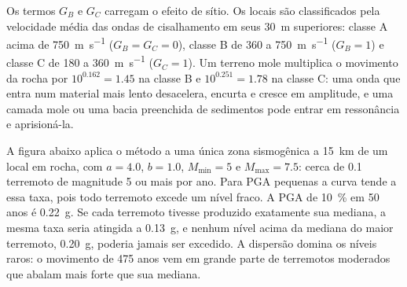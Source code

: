 Os termos $G_B$ e $G_C$ carregam o efeito de sítio. Os locais são classificados pela velocidade média das ondas
de cisalhamento em seus \qty{30}{m} superiores: classe A acima de \qty{750}{m.s^{-1}} ($G_B = G_C = 0$), classe B de
360 a \qty{750}{m.s^{-1}} ($G_B = 1$) e classe C de 180 a \qty{360}{m.s^{-1}} ($G_C = 1$). Um terreno
mole multiplica o movimento da rocha por $10^{0.162} = 1.45$ na classe B e $10^{0.251} = 1.78$ na classe
C: uma onda que entra num material mais lento desacelera, encurta e cresce em amplitude, e uma camada mole ou uma
bacia preenchida de sedimentos pode entrar em ressonância e aprisioná-la.

A figura abaixo aplica o método a uma única zona sismogênica a \qty{15}{km} de um local em rocha, com $a
= 4.0$, $b = 1.0$, $M_{\min} = 5$ e $M_{\max} = 7.5$: cerca de 0.1 terremoto de magnitude 5 ou
mais por ano. Para PGA pequenas a curva tende a essa taxa, pois todo terremoto excede um nível
fraco. A PGA de \qty{10}{\percent} em 50 anos é \qty{0.22}{g}. Se cada terremoto tivesse produzido
exatamente sua mediana, a mesma taxa seria atingida a \qty{0.13}{g}, e nenhum nível acima da mediana
do maior terremoto, \qty{0.20}{g}, poderia jamais ser excedido. A dispersão domina os níveis
raros: o movimento de 475 anos vem em grande parte de terremotos moderados que abalam mais forte que sua
mediana.

